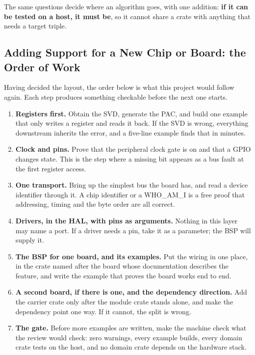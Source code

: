 The same questions decide where an algorithm goes, with one addition: \textbf{if it can be
tested on a host, it must be}, so it cannot share a crate with anything that needs a target
triple.

\subsection{Adding Support for a New Chip or Board: the Order of Work}

Having decided the layout, the order below is what this project would follow again. Each step
produces something checkable before the next one starts.

\begin{enumerate}
    \item \textbf{Registers first.} Obtain the SVD, generate the PAC, and build one example
          that only writes a register and reads it back. If the SVD is wrong, everything
          downstream inherits the error, and a five-line example finds that in minutes.
    \item \textbf{Clock and pins.} Prove that the peripheral clock gate is on and that a GPIO
          changes state. This is the step where a missing
           bit appears as a bus fault at the first register access.
    \item \textbf{One transport.} Bring up the simplest bus the board has, and read a device
          identifier through it. A chip identifier or a WHO\_AM\_I is a free proof that
          addressing, timing and the byte order are all correct.
    \item \textbf{Drivers, in the HAL, with pins as arguments.} Nothing in this layer may name
          a port. If a driver needs a pin, take it as a parameter; the BSP will supply it.
    \item \textbf{The BSP for one board, and its examples.} Put the wiring in one place, in
          the crate named after the board whose documentation describes the feature, and
          write the example that proves the board works end to end.
    \item \textbf{A second board, if there is one, and the dependency direction.} Add the
          carrier crate only after the module crate stands alone, and make the dependency
          point one way. If it cannot, the split is wrong.
    \item \textbf{The gate.} Before more examples are written, make the machine check what
          the review would check: zero warnings, every example builds, every domain crate
          tests on the host, and no domain crate depends on the hardware stack.
\end{enumerate}

